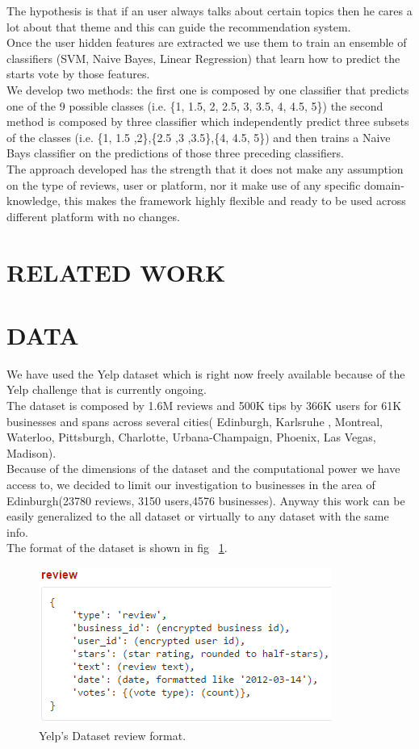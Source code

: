 \documentclass[11pt]{article}
\begin{document}
The hypothesis is that if an user always talks about certain topics then he cares a lot about that theme and this can guide the recommendation system.\\
Once the user hidden features are extracted we use them to train an ensemble of classifiers (SVM, Naive Bayes, Linear Regression) that learn how to predict the starts vote by those features.\\
We develop two methods: the first one is composed by one classifier that predicts one of the 9 possible classes (i.e. \{1, 1.5, 2, 2.5, 3, 3.5, 4, 4.5, 5\}) the second method is composed by three classifier which independently predict three subsets of the classes (i.e. \{1, 1.5 ,2\},\{2.5 ,3 ,3.5\},\{4, 4.5, 5\}) and then trains a Naive Bays classifier on the predictions of those three preceding classifiers.\\
The approach developed has the strength that it does not make any assumption on the type of reviews, user or platform, nor it make use of any specific domain-knowledge, this makes the framework highly flexible and ready to be used across different platform with no changes.

\section{RELATED WORK}

\section{DATA}
We have used the Yelp dataset\cite{yelp} which is right now freely available because of the Yelp challenge that is currently ongoing.\\
The dataset is composed by 1.6M reviews and 500K tips by 366K users for 61K businesses and spans across several cities( Edinburgh, Karlsruhe
, Montreal, Waterloo, Pittsburgh, Charlotte, Urbana-Champaign, Phoenix, Las Vegas, Madison).\\
Because of the dimensions of the dataset and the computational power we have access to, we decided to limit our investigation to businesses in the area of Edinburgh(23780 reviews, 3150 users,4576 businesses). Anyway this work can be easily generalized to the all dataset or virtually to any dataset with the same info.\\
The format of the dataset is shown in fig ~\ref{review}.
\begin{figure}[thpb]
	\includegraphics[scale=0.75]{img/review.png}
	\caption{Yelp's Dataset review format.}
	\label{review}
\end{figure}
\end{document}
